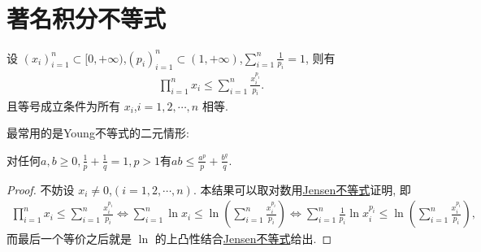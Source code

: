\documentclass[../../main.tex]{subfiles}%
\begin{document}
\section{著名积分不等式}

\begin{theorem}[Young不等式初等形式]\label{theorem:Young不等式初等形式}
设 $(x_i)_{i = 1}^n \subset [0, +\infty)$,$(p_i)_{i = 1}^n \subset (1, +\infty)$,$\sum_{i = 1}^n \frac{1}{p_i} = 1$, 则有
\begin{align*}
\prod_{i = 1}^n x_i \leqslant \sum_{i = 1}^n \frac{x_i^{p_i}}{p_i}.
\end{align*}
且等号成立条件为所有 $x_i$,$i = 1,2,\cdots,n$ 相等.
\end{theorem}
\begin{note}
最常用的是Young不等式的二元情形:

对任何$a,b\geqslant 0,\frac{1}{p}+\frac{1}{q}=1,p>1$有$ab\leqslant \frac{a^p}{p}+\frac{b^q}{q}.$
\end{note}
\begin{proof}

不妨设 $x_i \neq 0$,$(i = 1,2,\cdots,n)$. 本结果可以取对数用\hyperref[theorem:Jensen不等式1111]{Jensen不等式}证明, 即
\begin{align*}
\prod_{i = 1}^n x_i \leqslant \sum_{i = 1}^n \frac{x_i^{p_i}}{p_i}\Leftrightarrow \sum_{i = 1}^n \ln x_i \leqslant \ln \left(\sum_{i = 1}^n \frac{x_i^{p_i}}{p_i}\right) \Leftrightarrow \sum_{i = 1}^n \frac{1}{p_i} \ln x_i^{p_i} \leqslant \ln \left(\sum_{i = 1}^n \frac{x_i^{p_i}}{p_i}\right),
\end{align*}
而最后一个等价之后就是 $\ln$ 的上凸性结合\hyperref[theorem:Jensen不等式1111]{Jensen不等式}给出.

\end{proof}
\end{document}
